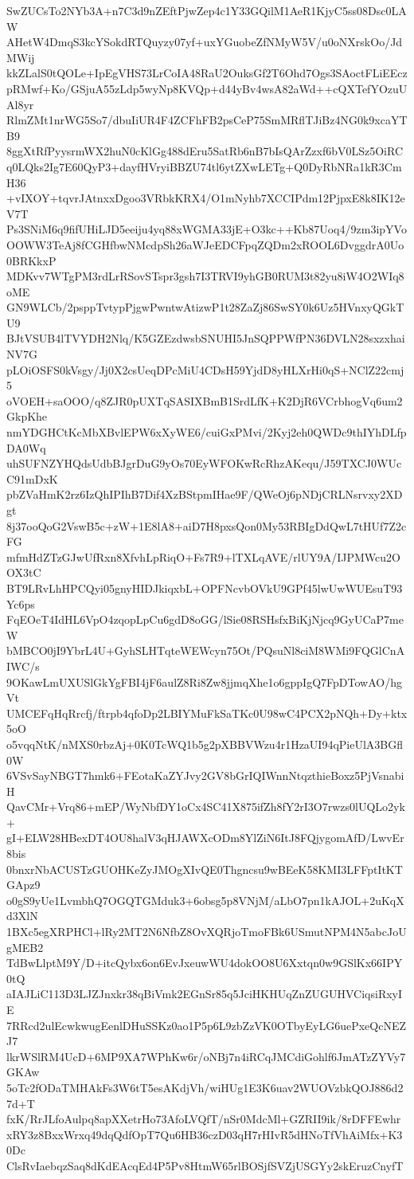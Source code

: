 SwZUCsTo2NYb3A+n7C3d9nZEftPjwZep4c1Y33GQilM1AeR1KjyC5ss08Dsc0LAW
AHetW4DmqS3kcYSokdRTQuyzy07yf+uxYGuobeZfNMyW5V/u0oNXrskOo/JdMWij
kkZLalS0tQOLe+IpEgVHS73LrCoIA48RaU2OuksGf2T6Ohd7Ogs3SAoctFLiEEcz
pRMwf+Ko/GSjuA55zLdp5wyNp8KVQp+d44yBv4wsA82aWd++cQXTefYOzuUAl8yr
RlmZMt1nrWG5So7/dbuIiUR4F4ZCFhFB2psCeP75SmMRflTJiBz4NG0k9xcaYTB9
8ggXtRfPyysrmWX2huN0cKlGg488dEru5SatRb6nB7bIsQArZzxf6bV0LSz5OiRC
q0LQks2Ig7E60QyP3+dayfHVryiBBZU74tl6ytZXwLETg+Q0DyRbNRa1kR3CmH36
+vIXOY+tqvrJAtnxxDgoo3VRbkKRX4/O1mNyhb7XCCIPdm12PjpxE8k8IK12eV7T
Ps3SNiM6q9fifUHiLJD5eeiju4yq88xWGMA33jE+O3kc++Kb87Uoq4/9zm3ipYVo
OOWW3TeAj8fCGHfbwNMcdpSh26aWJeEDCFpqZQDm2xROOL6DvggdrA0Uo0BRKkxP
MDKvv7WTgPM3rdLrRSovSTspr3gsh7I3TRVI9yhGB0RUM3t82yu8iW4O2WIq8oME
GN9WLCb/2psppTvtypPjgwPwntwAtizwP1t28ZaZj86SwSY0k6Uz5HVnxyQGkTU9
BJtVSUB4lTVYDH2Nlq/K5GZEzdwsbSNUHI5JnSQPPWfPN36DVLN28sxzxhaiNV7G
pLOiOSFS0kVsgy/Jj0X2csUeqDPcMiU4CDsH59YjdD8yHLXrHi0qS+NClZ22cmj5
oVOEH+saOOO/q8ZJR0pUXTqSASIXBmB1SrdLfK+K2DjR6VCrbhogVq6um2GkpKhe
nmYDGHCtKcMbXBvlEPW6xXyWE6/cuiGxPMvi/2Kyj2eh0QWDc9thIYhDLfpDA0Wq
uhSUFNZYHQdsUdbBJgrDuG9yOs70EyWFOKwRcRhzAKequ/J59TXCJ0WUcC91mDxK
pbZVaHmK2rz6IzQhIPIhB7Dif4XzBStpmIHae9F/QWeOj6pNDjCRLNsrvxy2XDgt
8j37ooQoG2VswB5c+zW+1E8lA8+aiD7H8pxsQon0My53RBIgDdQwL7tHUf7Z2cFG
mfmHdZTzGJwUfRxn8XfvhLpRiqO+Fs7R9+lTXLqAVE/rlUY9A/IJPMWcu2OOX3tC
BT9LRvLhHPCQyi05gnyHIDJkiqxbL+OPFNcvbOVkU9GPf45lwUwWUEsuT93Yc6ps
FqEOeT4IdHL6VpO4zqopLpCu6gdD8oGG/lSie08RSHsfxBiKjNjcq9GyUCaP7meW
bMBCO0jI9YbrL4U+GyhSLHTqteWEWcyn75Ot/PQsuNl8ciM8WMi9FQGlCnAIWC/s
9OKawLmUXUSlGkYgFBI4jF6aulZ8Ri8Zw8jjmqXhe1o6gppIgQ7FpDTowAO/hgVt
UMCEFqHqRrcfj/ftrpb4qfoDp2LBIYMuFkSaTKc0U98wC4PCX2pNQh+Dy+ktx5oO
o5vqqNtK/nMXS0rbzAj+0K0TcWQ1b5g2pXBBVWzu4r1HzaUI94qPieUlA3BGfl0W
6VSvSayNBGT7hmk6+FEotaKaZYJvy2GV8bGrIQIWnnNtqzthieBoxz5PjVsnabiH
QavCMr+Vrq86+mEP/WyNbfDY1oCx4SC41X875ifZh8fY2rI3O7rwzs0lUQLo2yk+
gI+ELW28HBexDT4OU8halV3qHJAWXcODm8YlZiN6ItJ8FQjygomAfD/LwvEr8bis
0bnxrNbACUSTzGUOHKeZyJMOgXIvQE0Thgncsu9wBEeK58KMI3LFFptItKTGApz9
o0gS9yUe1LvmbhQ7OGQTGMduk3+6obsg5p8VNjM/aLbO7pn1kAJOL+2uKqXd3XlN
1BXc5egXRPHCl+lRy2MT2N6NfbZ8OvXQRjoTmoFBk6USmutNPM4N5abcJoUgMEB2
TdBwLlptM9Y/D+itcQybx6on6EvJxeuwWU4dokOO8U6Xxtqn0w9GSlKx66IPY0tQ
aIAJLiC113D3LJZJnxkr38qBiVmk2EGnSr85q5JciHKHUqZnZUGUHVCiqsiRxyIE
7RRcd2ulEcwkwugEenlDHuSSKz0ao1P5p6L9zbZzVK0OTbyEyLG6uePxeQcNEZJ7
lkrWSlRM4UcD+6MP9XA7WPhKw6r/oNBj7n4iRCqJMCdiGohlf6JmATzZYVy7GKAw
5oTc2fODaTMHAkFs3W6tT5esAKdjVh/wiHUg1E3K6uav2WUOVzbkQOJ886d27d+T
fxK/RrJLfoAulpq8apXXetrHo73AfoLVQfT/nSr0MdcMl+GZRII9ik/8rDFFEwhr
xRY3z8BxxWrxq49dqQdfOpT7Qu6HB36czD03qH7rHIvR5dHNoTfVhAiMfx+K30Dc
ClsRvIaebqzSaq8dKdEAcqEd4P5Pv8HtmW65rlBOSjfSVZjUSGYy2skEruzCnyfT

